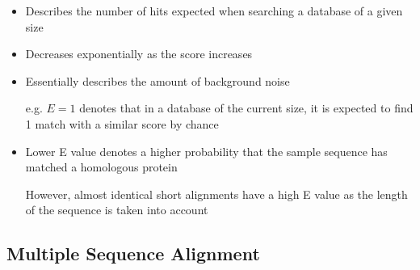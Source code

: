 \documentclass[a4paper]{article}
\begin{document}

\begin{itemize}
  \item
    Describes the number of hits expected when searching a database of a given
    size

  \item
    Decreases exponentially as the score increases

  \item
    Essentially describes the amount of background noise

    e.g. $E=1$ denotes that in a database of the current size, it is expected to
    find 1 match with a similar score by chance

  \item
    Lower E value denotes a higher probability that the sample sequence has
    matched a homologous protein

    However, almost identical short alignments have a high E value as the length
    of the sequence is taken into account
\end{itemize}

\subsection{Multiple Sequence Alignment}
\end{document}
